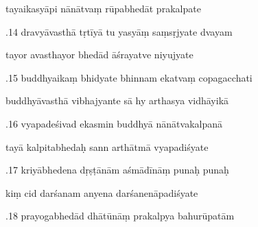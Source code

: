 \documentclass[article,12pt,a4paper]{memoir}%
\newcounter{parCount}
\begin{document}
	  
	  \pstart \leavevmode%
	tayaikasyāpi nānātvaṃ rūpabhedāt prakalpate 
	{}
	\pend%
      

	  
	  \pstart {}.14 dravyāvasthā tṛtīyā tu yasyāṃ saṃsṛjyate dvayam 
	{}
	\pend%
      

	  
	  \pstart \leavevmode%
	tayor avasthayor bhedād āśrayatve niyujyate 
	{}
	\pend%
      

	  
	  \pstart {}.15 buddhyaikaṃ bhidyate bhinnam ekatvaṃ copagacchati 
	{}
	\pend%
      

	  
	  \pstart \leavevmode%
	buddhyāvasthā vibhajyante sā hy arthasya vidhāyikā 
	{}
	\pend%
      

	  
	  \pstart {}.16 vyapadeśivad ekasmin buddhyā nānātvakalpanā 
	{}
	\pend%
      

	  
	  \pstart \leavevmode%
	tayā kalpitabhedaḥ sann arthātmā vyapadiśyate 
	{}
	\pend%
      

	  
	  \pstart {}.17 kriyābhedena dṛṣṭānām aśmādīnāṃ punaḥ punaḥ 
	{}
	\pend%
      

	  
	  \pstart \leavevmode%
	kiṃ cid darśanam anyena darśanenāpadiśyate 
	{}
	\pend%
      

	  
	  \pstart {}.18 prayogabhedād dhātūnāṃ prakalpya bahurūpatām 
	{}
	\pend%
      
\end{document}
